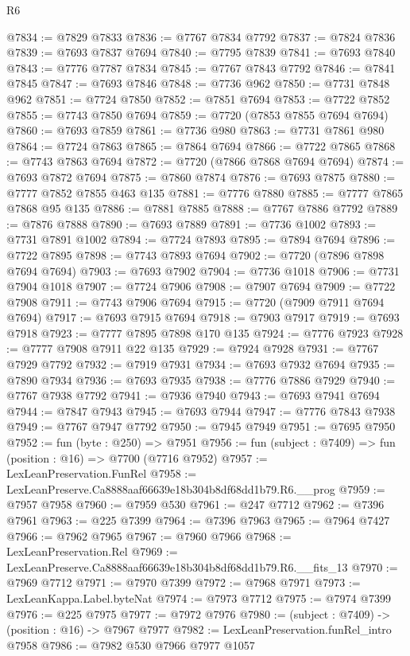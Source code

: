 \begin{lexlean}{R6}
\begin{coremodule}
@7834 := @7829 @7833
@7836 := @7767 @7834 @7792
@7837 := @7824 @7836
@7839 := @7693 @7837 @7694
@7840 := @7795 @7839
@7841 := @7693 @7840
@7843 := @7776 @7787 @7834
@7845 := @7767 @7843 @7792
@7846 := @7841 @7845
@7847 := @7693 @7846
@7848 := @7736 @962
@7850 := @7731 @7848 @962
@7851 := @7724 @7850
@7852 := @7851 @7694
@7853 := @7722 @7852
@7855 := @7743 @7850 @7694
@7859 := @7720 (@7853 @7855 @7694 @7694)
@7860 := @7693 @7859
@7861 := @7736 @980
@7863 := @7731 @7861 @980
@7864 := @7724 @7863
@7865 := @7864 @7694
@7866 := @7722 @7865
@7868 := @7743 @7863 @7694
@7872 := @7720 (@7866 @7868 @7694 @7694)
@7874 := @7693 @7872 @7694
@7875 := @7860 @7874
@7876 := @7693 @7875
@7880 := @7777 @7852 @7855 @463 @135
@7881 := @7776 @7880
@7885 := @7777 @7865 @7868 @95 @135
@7886 := @7881 @7885
@7888 := @7767 @7886 @7792
@7889 := @7876 @7888
@7890 := @7693 @7889
@7891 := @7736 @1002
@7893 := @7731 @7891 @1002
@7894 := @7724 @7893
@7895 := @7894 @7694
@7896 := @7722 @7895
@7898 := @7743 @7893 @7694
@7902 := @7720 (@7896 @7898 @7694 @7694)
@7903 := @7693 @7902
@7904 := @7736 @1018
@7906 := @7731 @7904 @1018
@7907 := @7724 @7906
@7908 := @7907 @7694
@7909 := @7722 @7908
@7911 := @7743 @7906 @7694
@7915 := @7720 (@7909 @7911 @7694 @7694)
@7917 := @7693 @7915 @7694
@7918 := @7903 @7917
@7919 := @7693 @7918
@7923 := @7777 @7895 @7898 @170 @135
@7924 := @7776 @7923
@7928 := @7777 @7908 @7911 @22 @135
@7929 := @7924 @7928
@7931 := @7767 @7929 @7792
@7932 := @7919 @7931
@7934 := @7693 @7932 @7694
@7935 := @7890 @7934
@7936 := @7693 @7935
@7938 := @7776 @7886 @7929
@7940 := @7767 @7938 @7792
@7941 := @7936 @7940
@7943 := @7693 @7941 @7694
@7944 := @7847 @7943
@7945 := @7693 @7944
@7947 := @7776 @7843 @7938
@7949 := @7767 @7947 @7792
@7950 := @7945 @7949
@7951 := @7695 @7950
@7952 := fun (byte : @250) => @7951
@7956 := fun (subject : @7409) => fun (position : @16) => @7700 (@7716 @7952)
@7957 := LexLeanPreservation.FunRel
@7958 := LexLeanPreserve.Ca8888aaf66639e18b304b8df68dd1b79.R6.__prog
@7959 := @7957 @7958
@7960 := @7959 @530
@7961 := @247 @7712
@7962 := @7396 @7961
@7963 := @225 @7399
@7964 := @7396 @7963
@7965 := @7964 @7427
@7966 := @7962 @7965
@7967 := @7960 @7966
@7968 := LexLeanPreservation.Rel
@7969 := LexLeanPreserve.Ca8888aaf66639e18b304b8df68dd1b79.R6.__fits_13
@7970 := @7969 @7712
@7971 := @7970 @7399
@7972 := @7968 @7971
@7973 := LexLeanKappa.Label.byteNat
@7974 := @7973 @7712
@7975 := @7974 @7399
@7976 := @225 @7975
@7977 := @7972 @7976
@7980 := (subject : @7409) -> (position : @16) -> @7967 @7977
@7982 := LexLeanPreservation.funRel_intro @7958
@7986 := @7982 @530 @7966 @7977 @1057

\end{coremodule}
\end{lexlean}
